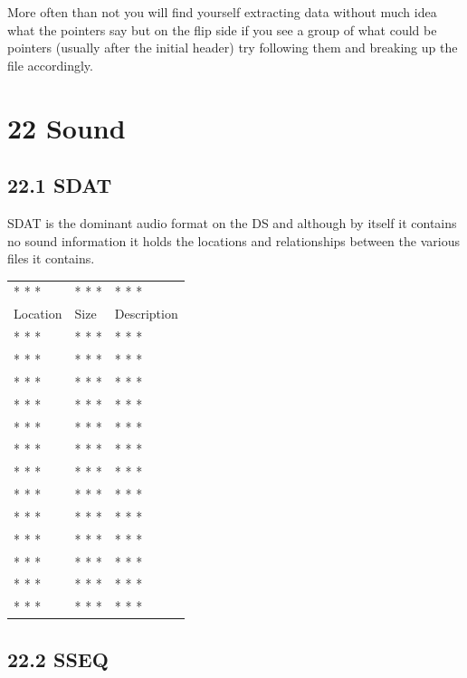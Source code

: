 \documentclass[
]{book}
\begin{document}
More often than not you will find yourself extracting data without much idea what the pointers say but on the flip side if you see a group of what could be pointers (usually after the initial header) try following them and breaking up the file accordingly.

\hypertarget{sound-1}{%
\chapter{22 Sound}\label{sound-1}}

\hypertarget{sdat}{%
\section{22.1 SDAT}\label{sdat}}

SDAT is the dominant audio format on the DS and although by itself it contains no sound information it holds the locations and relationships between the various files it contains.

\begin{longtable}[]{@{}lll@{}}
\toprule()
\endhead
* * * & * * * & * * * \\
Location & Size & Description \\
* * * & * * * & * * * \\
* * * & * * * & * * * \\
* * * & * * * & * * * \\
* * * & * * * & * * * \\
* * * & * * * & * * * \\
* * * & * * * & * * * \\
* * * & * * * & * * * \\
* * * & * * * & * * * \\
* * * & * * * & * * * \\
* * * & * * * & * * * \\
* * * & * * * & * * * \\
* * * & * * * & * * * \\
* * * & * * * & * * * \\
\bottomrule()
\end{longtable}

\hypertarget{sseq}{%
\section{22.2 SSEQ}\label{sseq}}
\end{document}
